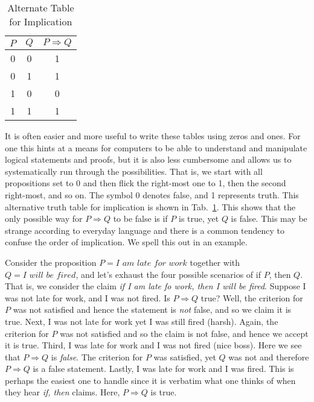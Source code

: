         \begin{minipage}[b]{0.49\textwidth}
            \centering
            \begin{table}[H]
                \centering
                \captionsetup{type=table}
                \begin{tabular}{c|c|c}
                    $P$&$Q$&$P\Rightarrow{Q}$\\
                    \hline
                    0&0&1\\
                    0&1&1\\
                    1&0&0\\
                    1&1&1
                \end{tabular}
                \caption{Alternate Table for Implication}
                \label{tab:Alternate_Truth_Table_Implication}
            \end{table}
        \end{minipage}
        \par\vspace{2.5ex}
        It is often easier and more useful to write these tables using zeros and
        ones. For one this hints at a means for computers to be able to
        understand and manipulate logical statements and proofs, but it is also
        less cumbersome and allows us to systematically run through the
        possibilities. That is, we start with all propositions set to 0 and then
        flick the right-most one to 1, then the second right-most, and so on.
        The symbol 0 denotes false, and 1 represents truth. This alternative
        truth table for implication is shown in
        Tab.~\ref{tab:Alternate_Truth_Table_Implication}.
        This shows that the only possible way for $P\Rightarrow{Q}$ to be false
        is if $P$ is true, yet $Q$ is false. This may be strange according to
        everyday language and there is a common tendency to confuse the order of
        implication. We spell this out in an example.
        \begin{example}
            Consider the proposition $P=\textit{I am late for work}$ together
            with $Q=\textit{I will be fired}$, and let's exhaust the four
            possible scenarios of if $P$, then $Q$. That is, we consider the
            claim \textit{if I am late fo work, then I will be fired}. Suppose
            I was not late for work, and I was not fired. Is $P\Rightarrow{Q}$
            true? Well, the criterion for $P$ was not satisfied and hence the
            statement is \textit{not} false, and so we claim it is true. Next, I
            was not late for work yet I was still fired (harsh). Again, the
            criterion for $P$ was not satisfied and so the claim is not false,
            and hence we accept it is true. Third, I was late for work and I was
            not fired (nice boss). Here we see that $P\Rightarrow{Q}$ is
            \textit{false}. The criterion for $P$ was satisfied, yet $Q$ was not
            and therefore $P\Rightarrow{Q}$ is a false statement. Lastly, I was
            late for work and I was fired. This is perhaps the easiest one to
            handle since it is verbatim what one thinks of when they hear
            \textit{if, then} claims. Here, $P\Rightarrow{Q}$ is true.
        \end{example}
